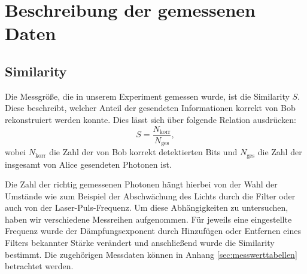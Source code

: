 \section{Beschreibung der gemessenen Daten}
\subsection{Similarity}
Die Messgröße, die in unserem Experiment gemessen wurde, ist die Similarity $S$.
Diese beschreibt, welcher Anteil der gesendeten Informationen korrekt von Bob
rekonstruiert werden konnte. Dies lässt sich über folgende Relation ausdrücken:
\begin{equation}
S = \frac{N_{\mathrm{korr}}}{N_{\mathrm{ges}}},
\end{equation}
wobei $N_{\mathrm{korr}}$ die Zahl der von Bob korrekt detektierten Bits und
$N_{\mathrm{ges}}$ die Zahl der insgesamt von Alice gesendeten Photonen ist.

Die Zahl der richtig gemessenen Photonen hängt hierbei von der Wahl der
Umstände wie zum Beispiel der Abschwächung des Lichts durch die Filter oder
auch von der Laser-Puls-Frequenz. Um diese Abhängigkeiten zu untersuchen, haben
wir verschiedene Messreihen aufgenommen. Für jeweils eine eingestellte Frequenz
wurde der Dämpfungsexponent durch Hinzufügen oder Entfernen eines Filters
bekannter Stärke verändert und anschließend wurde die Similarity bestimmt. Die
zugehörigen Messdaten können in Anhang \ref{sec:messwerttabellen} betrachtet
werden.